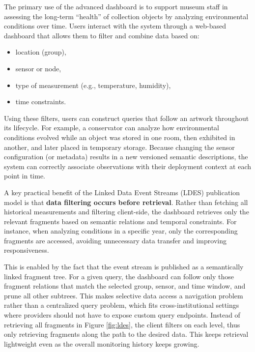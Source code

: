 \documentclass{ceurart}
\providecommand{\tightlist}{%
  \setlength{\itemsep}{0pt}\setlength{\parskip}{0pt}}
\begin{document}
The primary use of the advanced dashboard is to support museum staff in
assessing the long-term ``health'' of collection objects by analyzing
environmental conditions over time. Users interact with the system
through a web-based dashboard that allows them to filter and combine
data based on:

\begin{itemize}
\tightlist
\item
  location (group),
\item
  sensor or node,
\item
  type of measurement (e.g., temperature, humidity),
\item
  time constraints.
\end{itemize}

Using these filters, users can construct queries that follow an artwork
throughout its lifecycle. For example, a conservator can analyze how
environmental conditions evolved while an object was stored in one room,
then exhibited in another, and later placed in temporary storage.
Because changing the sensor configuration (or metadata) results in a new
versioned semantic descriptions, the system can correctly associate
observations with their deployment context at each point in time.

A key practical benefit of the Linked Data Event Streams (LDES)
publication model is that \textbf{data filtering occurs before
retrieval}. Rather than fetching all historical measurements and
filtering client-side, the dashboard retrieves only the relevant
fragments based on semantic relations and temporal constraints. For
instance, when analyzing conditions in a specific year, only the
corresponding fragments are accessed, avoiding unnecessary data transfer
and improving responsiveness.

This is enabled by the fact that the event stream is published as a
semantically linked fragment tree. For a given query, the dashboard can
follow only those fragment relations that match the selected group,
sensor, and time window, and prune all other subtrees. This makes
selective data access a navigation problem rather than a centralized
query problem, which fits cross-institutional settings where providers
should not have to expose custom query endpoints. Instead of retrieving
all fragments in Figure \ref{fig:ldes}, the client filters on each
level, thus only retrieving fragments along the path to the desired
data. This keeps retrieval lightweight even as the overall monitoring
history keeps growing.
\end{document}
